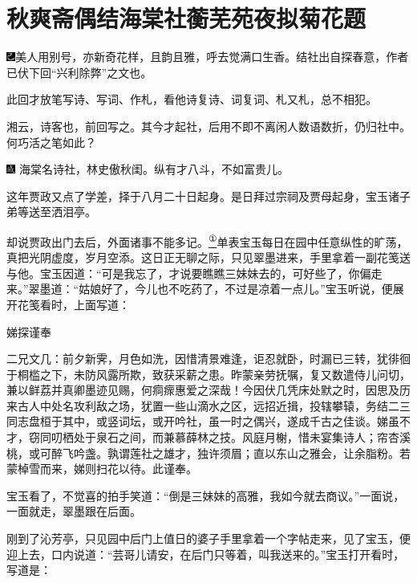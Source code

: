 

\chapter{秋爽斋偶结海棠社\hspace{.5em}蘅芜苑夜拟菊花题}

{\includegraphics[width=3mm]{../Images/00003}美人用别号，亦新奇花样，且韵且雅，呼去觉满口生香。结社出自探春意，作者已伏下回``兴利除弊''之文也。}

{此回才放笔写诗、写词、作札，看他诗复诗、词复词、札又札，总不相犯。}

{湘云，诗客也，前回写之。其今才起社，后用不即不离闲人数语数折，仍归社中。何巧活之笔如此？}

{\includegraphics[width=3mm]{../Images/00005}  \kaishu 海棠名诗社，林史傲秋闺。纵有才八斗，不如富贵儿。}

这年贾政又点了学差，择于八月二十日起身。是日拜过宗祠及贾母起身，宝玉诸子弟等送至洒泪亭。

却说贾政出门去后，外面诸事不能多记。\href{../Text/part0041_split_000.html\#lnkback_1_a}{\textsuperscript{①}}单表宝玉每日在园中任意纵性的旷荡，真把光阴虚度，岁月空添。这日正无聊之际，只见翠墨进来，手里拿着一副花笺送与他。宝玉因道：``可是我忘了，才说要瞧瞧三妹妹去的，可好些了，你偏走来。''翠墨道：``姑娘好了，今儿也不吃药了，不过是凉着一点儿。''宝玉听说，便展开花笺看时，上面写道：

娣探谨奉

二兄文几：前夕新霁，月色如洗，因惜清景难逢，讵忍就卧，时漏已三转，犹徘徊于桐槛之下，未防风露所欺，致获采薪之患。昨蒙亲劳抚嘱，复又数遣侍儿问切，兼以鲜荔并真卿墨迹见赐，何痌瘝惠爱之深哉！今因伏几凭床处默之时，因思及历来古人中处名攻利敌之场，犹置一些山滴水之区，远招近揖，投辖攀辕，务结二三同志盘桓于其中，或竖词坛，或开吟社，虽一时之偶兴，遂成千古之佳谈。娣虽不才，窃同叨栖处于泉石之间，而兼慕薛林之技。风庭月榭，惜未宴集诗人；帘杏溪桃，或可醉飞吟盏。孰谓莲社之雄才，独许须眉；直以东山之雅会，让余脂粉。若蒙棹雪而来，娣则扫花以待。此谨奉。

宝玉看了，不觉喜的拍手笑道：``倒是三妹妹的高雅，我如今就去商议。''一面说，一面就走，翠墨跟在后面。

刚到了沁芳亭，只见园中后门上值日的婆子手里拿着一个字帖走来，见了宝玉，便迎上去，口内说道：``芸哥儿请安，在后门只等着，叫我送来的。''宝玉打开看时，写道是：

